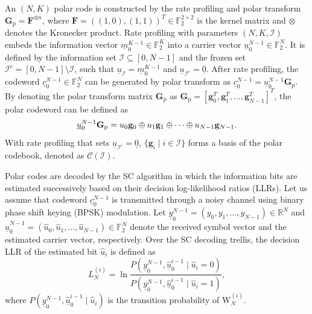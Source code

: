 \documentclass[12pt, draftclsnofoot, peerreview, onecolumn]{IEEEtran}
\theoremstyle{noparent}
\begin{document}
An $(N, K)$ polar code is constructed by the rate profiling
and polar transform $\mathbf{G}_{\mathrm{p}}=\mathbf{F}^{\otimes n}$, 
where $\mathbf{F}=((1,0),(1,1))^{T} \in \mathbb{F}_{2}^{2 \times 2}$ 
is the kernel matrix and $\otimes$ denotes the Kronecker product.
Rate profiling with parameters $(N,K,\mathcal{I})$ embeds the information vector
$\underline{m}_{0}^{K-1} \in \mathbb{F}_{2}^{K}$ into a carrier vector 
$\underline{u}_{0}^{N-1} \in \mathbb{F}_{2}^{N}$.
It is defined by the information set $\mathcal{I} \subseteq [0,N-1]$ 
and the frozen set $\mathcal{I}^c=[0, N-1]\setminus\mathcal{I}$,
such that
$\underline{u}_{\mathcal{I}}=\underline{m}_{0}^{K-1}$ and $\underline{u}_{\mathcal{I}^c}=\underline{0}$.
After rate profiling, the codeword $\underline{c}_{0}^{N-1} \in \mathbb{F}_{2}^{N}$ can be generated by
polar transform as $\underline{c}_{0}^{N-1}=\underline{u}_{0}^{N-1} \mathbf{G}_{\mathrm{p}}$.
By denoting the polar transform matrix $\mathbf{G}_{\mathrm{p}}$ as
$\mathbf{G}_{\mathrm{p}}=[\mathbf{g}_0^T, \mathbf{g}_1^T, \ldots, \mathbf{g}_{N-1}^T]^T$,
the polar codeword can be defined as 
\begin{equation}
    \underline{u}_{0}^{N-1}\mathbf{G}_{\mathrm{p}}=u_{0}\mathbf{g}_{0}\oplus u_{1}\mathbf{g}_{1}\oplus \cdots \oplus u_{N-1}\mathbf{g}_{N-1}. \\
    \label{linear_combination_of_rows}
\end{equation}
With rate profiling that sets $\underline{u}_{\mathcal{I}^{c}}=\underline{0}$,
$\{\mathbf{g}_i \mid i\in\mathcal{I} \}$ forms a basis of the polar codebook, denoted as $\mathcal{C}(\mathcal{I})$.

Polar codes are decoded by
the SC algorithm in which 
the information bits are estimated successively 
based on their decision log-likelihood ratios (LLRs).
Let us assume that codeword $\underline{c}_{0}^{N-1}$ is transmitted through a noisy channel using binary phase shift keying (BPSK) modulation.
Let $\underline{y}_{0}^{N-1}=\left(y_{0}, y_{1}, \ldots, y_{N-1}\right) \in \mathbb{R}^{N}$
and $\underline{\hat{u}}_{0}^{N-1} = \left(\hat{u}_{0},\hat{u}_{1}, \ldots, \hat{u}_{N-1}\right) \in \mathbb{F}_{2}^{N}$  
denote the received symbol vector and the estimated carrier vector, respectively.
Over the SC decoding trellis, the decision LLR of the estimated bit $\hat{u}_{i}$ is defined as 
\begin{equation}
    L_{N}^{(i)}=
    \ln \frac{P(\underline{y}_{0}^{N-1}, \underline{\hat{u}}_{0}^{i-1} \mid \hat{u}_{i}=0)}{P(\underline{y}_{0}^{N-1}, \underline{\hat{u}}_{0}^{i-1} \mid \hat{u}_{i}=1)},
    \label{desision_LLRs}
\end{equation}
where $P(\underline{y}_{0}^{N-1}, \underline{\hat{u}}_{0}^{i-1} \mid \hat{u}_{i})$ is the transition
probability of $\mathrm{W}_{N}^{(i)}$. 
\end{document}
